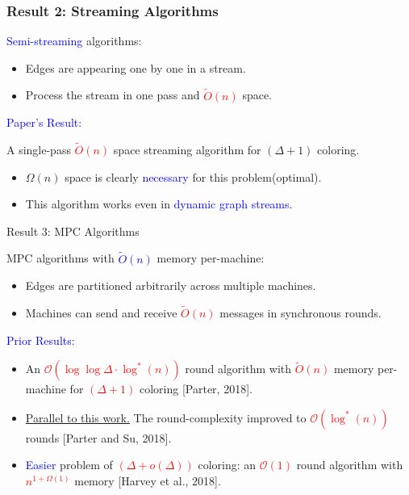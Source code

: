 \documentclass[aspectratio=169,xcolor=dvipsnames]{beamer}
\begin{document}
	\begin{frame}
		\frametitle{Result 2: Streaming Algorithms}
		
		\textcolor{blue}{Semi-streaming} algorithms:
		\begin{itemize}
			\item Edges are appearing one by one in a stream.
			\item Process the stream in one pass and \textcolor{red}{$\tilde{O}(n)$} space.
		\end{itemize}
		
		\vspace{0.5em}
		\textcolor{blue}{Paper's Result:}
		
		\begin{block}{}
			\centering
			A single-pass \textcolor{red}{$\tilde{O}(n)$} space streaming algorithm for {\color{red}$(\Delta + 1)$} coloring.
		\end{block}
		
		\begin{itemize}
			\item {\color{red}$\Omega(n)$} space is clearly \textcolor{blue}{necessary} for this problem(optimal).
			\item This algorithm works even in \textcolor{blue}{dynamic graph streams}.
		\end{itemize}
		
	\end{frame}
	
	\begin{frame}{Result 3: MPC Algorithms}
		
		MPC algorithms with \textcolor{blue}{{$\tilde{O}(n)$}} memory per-machine:
		\begin{itemize}
			\item Edges are partitioned arbitrarily across multiple machines.
			\item Machines can send and receive \textcolor{red}{$\tilde{O}(n)$} messages in synchronous rounds.
		\end{itemize}
		
		\vspace{0.5em}
		\textcolor{blue}{Prior Results:}
		\begin{itemize}
			\item An \textcolor{red}{$\mathcal{O}(\log \log \Delta \cdot \log^* (n))$} round algorithm with \textcolor{red}{$\tilde{O}(n)$} memory per-machine for \textcolor{red}{$(\Delta + 1)$} coloring \textcolor{green!50!black}{[Parter, 2018]}.
			
			\item \underline{Parallel to this work.} The round-complexity improved to \textcolor{red}{$\mathcal{O}(\log^* (n))$} rounds \textcolor{green!50!black}{[Parter and Su, 2018]}.
			
			\item \textcolor{blue}{Easier} problem of \textcolor{red}{$(\Delta + o(\Delta))$} coloring: an \textcolor{red}{$\mathcal{O}(1)$} round algorithm with \textcolor{red}{$n^{1+\Omega(1)}$} memory \textcolor{green!50!black}{[Harvey et al., 2018]}.
		\end{itemize}
		
	\end{frame}
	
\end{document}
